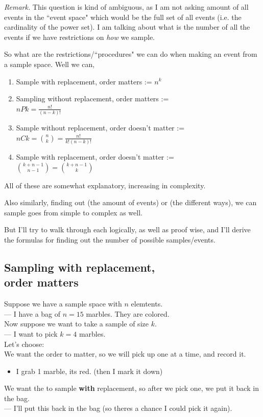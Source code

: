 \documentclass[12pt]{book}
\begin{document}
\noindent \textit{Remark. } This question is kind of ambiguous, as I am not asking amount of all events in the ``event space" which would be the full set of all events (i.e. the cardinality of the power set). I am talking about what is the number of all the events if we have restrictions on \textit{how} we sample. 

So what are the restrictions/``procedures" we can do when making an event from a sample space. Well we can,
\begin{enumerate}
\item Sample with replacement, order matters := $n^k$
\item Sampling without replacement, order matters := \\$nPk = \frac{n!}{(n-k)!}$
\item Sample without replacement, order doesn't matter := $nCk = {n \choose k} = \frac{n!}{k!(n-k)!}$
\item Sample with replacement, order doesn't matter := \\${k+n-1 \choose n-1}={k+n-1 \choose k}$ 
\end{enumerate}

All of these are somewhat explanatory, increasing in complexity.

Also similarly, finding out (the amount of events) or (the different ways), we can sample goes from simple to complex as well.

But I'll try to walk through each logically, as well as proof wise, and I'll derive the formulas for finding out the number of possible samples/events.





\subsection{Sampling with replacement, \\order matters}
Suppose we have a sample space with $n$ elemtents. \\
--- I have a bag of $n=15$ marbles. They are colored.\\
Now suppose we want to take a sample of size $k$. \\
--- I want to pick $k=4$ marbles.\\

\noindent Let's choose: \\
We want the order to matter, so we will pick up one at a time, and record it.
\begin{itemize}
\item I grab 1 marble, its red. (then I mark it down)
\end{itemize}
We want the to sample \textbf{with} replacement, so after we pick one, we put it back in the bag.\\
--- I'll put this back in the bag (so theres a chance I could pick it again).
\end{document}
